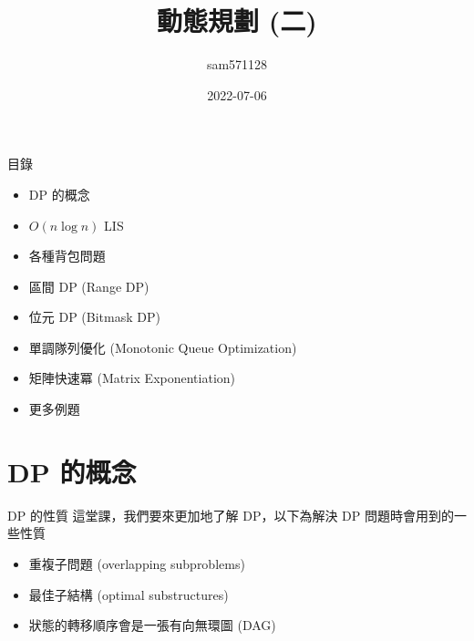 \documentclass[aspectratio=169]{beamer}
\title{動態規劃 (二)}
\author{sam571128}
\date{2022-07-06}
\begin{document}
\frame{\titlepage}

\begin{frame}{目錄}
    \begin{itemize}
        \item DP 的概念
        \item $O(n \log n)$ LIS
        \item 各種背包問題
        \item 區間 DP (Range DP)
        \item 位元 DP (Bitmask DP)
        \item 單調隊列優化 (Monotonic Queue Optimization)
        \item 矩陣快速冪 (Matrix Exponentiation)
        \item 更多例題
    \end{itemize}
\end{frame}

\section{DP 的概念}

\begin{frame}{DP 的性質}
    這堂課，我們要來更加地了解 DP，以下為解決 DP 問題時會用到的一些性質
    \begin{itemize}
        \item 重複子問題 (overlapping subproblems)
        \item 最佳子結構 (optimal substructures)
        \item 狀態的轉移順序會是一張有向無環圖 (DAG)
    \end{itemize}
\end{frame}
\end{document}
